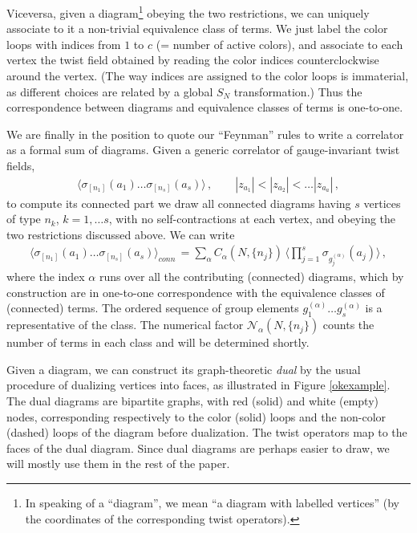 \documentclass[letterpaper]{JHEP3}
\def\s{\sigma}
\def\a{\alpha}
\def\be{\begin{equation}}
\def\ee{\end{equation}}
\def\a{\alpha}
\def\be{\begin{eqnarray}}
\def\ee{\end{eqnarray}}
\begin{document}
Viceversa, given a diagram\footnote{In speaking of a ``diagram'', we mean ``a diagram with labelled vertices'' 
(by the coordinates of the corresponding twist operators).} 
 obeying the two restrictions,
we can uniquely associate to it a non-trivial  equivalence class of terms.
 We just label the color loops with indices from $1$ to $c$ (= number of active colors),
  and associate to each vertex the twist field obtained by reading the color indices
counterclockwise around the vertex. (The way indices are assigned to the color loops is immaterial,
as different choices are related by a global $S_N$ transformation.) Thus the correspondence
between diagrams and equivalence classes of terms is one-to-one.
 


We are finally in the position to quote our  ``Feynman'' rules to write a correlator as a formal sum of diagrams.
Given a generic correlator of gauge-invariant twist fields,
\be\label{defccorr}
\langle \s_{[n_1]} (a_1)  \dots \s_{[n_s]} (a_s) \rangle \, ,  \qquad |z_{a_1}| < |z_{a_2}| < \dots |z_{a_a}| \, ,
\ee 
to compute its connected part we draw all  connected diagrams having $s$ vertices of type $n_k$, $k=1,\dots s$,
with no self-contractions at each vertex,
and obeying the two restrictions discussed above. We can write 
\be\label{pertexp00}
\langle \s_{[n_1]} (a_1)  \dots \s_{[n_s]} (a_s) \rangle_{conn} \,=\sum_{\a} C_{\a}(N,\{n_j\})\,
\langle\prod_{j=1}^s\s_{g_j^{(\a)}}(a_j)\rangle \, ,
\ee where the index  $\a$ runs over all the contributing (connected) diagrams, 
which by construction are in one-to-one correspondence  with the equivalence classes of (connected) terms.
The ordered sequence of group elements $g_1^{(\a)} \dots g_s^{(\a)} $ is a representative of the class.
The numerical factor $ {\mathcal N}_{\a}(N,\{n_j\})$ counts the number of terms in each class and
 will be determined shortly.


Given a diagram, we can construct its graph-theoretic {\it dual}  by the usual procedure of dualizing
vertices into faces, as illustrated in Figure \ref{okexample}. The dual diagrams are bipartite graphs,
with red (solid) and white (empty) nodes, corresponding respectively
to the color (solid) loops  and the non-color (dashed) loops of the diagram before dualization.
The twist operators map to the faces of the dual diagram. Since dual diagrams are perhaps easier to draw,
we will mostly use them in the rest of the paper.
\end{document}
